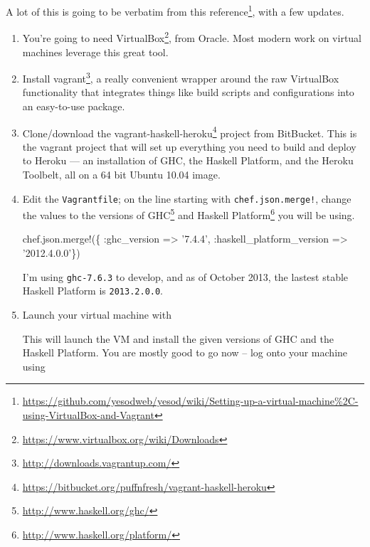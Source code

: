 \documentclass[]{article}
\newenvironment{Shaded}{}{}
\newcommand{\StringTok}[1]{\textcolor[rgb]{0.25,0.44,0.63}{{#1}}}
\newcommand{\ExtensionTok}[1]{{#1}}
\newcommand{\NormalTok}[1]{{#1}}
\renewcommand{\href}[2]{#2\footnote{\url{#1}}}
\begin{document}
A lot of this is going to be verbatim from
\href{https://github.com/yesodweb/yesod/wiki/Setting-up-a-virtual-machine\%2C-using-VirtualBox-and-Vagrant}{this
reference}, with a few updates.

\begin{enumerate}
\def\labelenumi{\arabic{enumi}.}
\item
  You're going to need
  \href{https://www.virtualbox.org/wiki/Downloads}{VirtualBox}, from Oracle.
  Most modern work on virtual machines leverage this great tool.
\item
  Install \href{http://downloads.vagrantup.com/}{vagrant}, a really convenient
  wrapper around the raw VirtualBox functionality that integrates things like
  build scripts and configurations into an easy-to-use package.
\item
  Clone/download the
  \href{https://bitbucket.org/puffnfresh/vagrant-haskell-heroku}{vagrant-haskell-heroku}
  project from BitBucket. This is the vagrant project that will set up
  everything you need to build and deploy to Heroku --- an installation of GHC,
  the Haskell Platform, and the Heroku Toolbelt, all on a 64 bit Ubuntu 10.04
  image.
\item
  Edit the \texttt{Vagrantfile}; on the line starting with
  \texttt{chef.json.merge!}, change the values to the versions of
  \href{http://www.haskell.org/ghc/}{GHC} and
  \href{http://www.haskell.org/platform/}{Haskell Platform} you will be using.

\begin{Shaded}
\begin{Highlighting}[]
\NormalTok{chef.json.merge!(\{ }\StringTok{:ghc_version} \NormalTok{=> }\StringTok{'7.4.4'}\NormalTok{,}
                   \StringTok{:haskell_platform_version} \NormalTok{=> }\StringTok{'2012.4.0.0'}\NormalTok{\})}
\end{Highlighting}
\end{Shaded}

  I'm using \texttt{ghc-7.6.3} to develop, and as of October 2013, the lastest
  stable Haskell Platform is \texttt{2013.2.0.0}.
\item
  Launch your virtual machine with

\begin{Shaded}
\end{Shaded}

  This will launch the VM and install the given versions of GHC and the Haskell
  Platform. You are mostly good to go now -- log onto your machine using


\end{enumerate}
\end{document}
